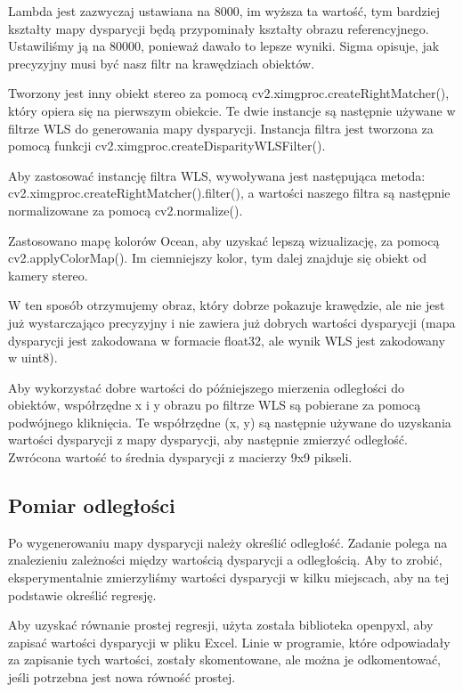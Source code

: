 \documentclass[magisterska]{pracadypl}
\begin{document}
Lambda jest zazwyczaj ustawiana na 8000, im wyższa ta wartość, tym bardziej kształty mapy dysparycji będą przypominały kształty obrazu referencyjnego. Ustawiliśmy ją na 80000, ponieważ dawało to lepsze wyniki. Sigma opisuje, jak precyzyjny musi być nasz filtr na krawędziach obiektów.

Tworzony jest inny obiekt stereo za pomocą cv2.ximgproc.createRightMatcher(), który opiera się na pierwszym obiekcie. Te dwie instancje są następnie używane w filtrze WLS do generowania mapy dysparycji. Instancja filtra jest tworzona za pomocą funkcji cv2.ximgproc.createDisparityWLSFilter().

Aby zastosować instancję filtra WLS, wywoływana jest następująca metoda: cv2.ximgproc.createRightMatcher().filter(), a wartości naszego filtra są następnie normalizowane za pomocą cv2.normalize().

Zastosowano mapę kolorów Ocean, aby uzyskać lepszą wizualizację, za pomocą cv2.applyColorMap(). Im ciemniejszy kolor, tym dalej znajduje się obiekt od kamery stereo.

W ten sposób otrzymujemy obraz, który dobrze pokazuje krawędzie, ale nie jest już wystarczająco precyzyjny i nie zawiera już dobrych wartości dysparycji (mapa dysparycji jest zakodowana w formacie float32, ale wynik WLS jest zakodowany w uint8).

Aby wykorzystać dobre wartości do późniejszego mierzenia odległości do obiektów, współrzędne x i y obrazu po filtrze WLS są pobierane za pomocą podwójnego kliknięcia. Te współrzędne (x, y) są następnie używane do uzyskania wartości dysparycji z mapy dysparycji, aby następnie zmierzyć odległość. Zwrócona wartość to średnia dysparycji z macierzy 9x9 pikseli.

\subsection{Pomiar odległości}

Po wygenerowaniu mapy dysparycji należy określić odległość. Zadanie polega na znalezieniu zależności między wartością dysparycji a odległością. Aby to zrobić, eksperymentalnie zmierzyliśmy wartości dysparycji w kilku miejscach, aby na tej podstawie określić regresję.

Aby uzyskać równanie prostej regresji, użyta została biblioteka openpyxl, aby zapisać wartości dysparycji w pliku Excel. Linie w programie, które odpowiadały za zapisanie tych wartości, zostały skomentowane, ale można je odkomentować, jeśli potrzebna jest nowa równość prostej.
\end{document}
